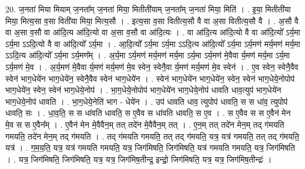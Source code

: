 \documentclass[17pt]{extarticle}
\begin{document}
20. ज॒नता॑ मिया मियाम् ज॒नता᳚म् ज॒नता॑ मिया॒ मितीती॑याम् ज॒नता᳚म् ज॒नता॑ मिया॒ मिति॑ । . इ॒या॒ मितीती॑या मिया॒ मित्य॒सा व॒सा विती॑या मिया॒ मित्य॒सौ । . इत्य॒सा व॒सा वितीत्य॒सौ वै वा अ॒सा वितीत्य॒सौ वै । . अ॒सौ वै वा अ॒सा व॒सौ वा आ॑दि॒त्य आ॑दि॒त्यो वा अ॒सा व॒सौ वा आ॑दि॒त्यः । . वा आ॑दि॒त्य आ॑दि॒त्यो वै वा आ॑दि॒त्यो᳚ ऽर्य॒मा ऽर्य॒मा ऽऽदि॒त्यो वै वा आ॑दि॒त्यो᳚ ऽर्य॒मा । . आ॒दि॒त्यो᳚ ऽर्य॒मा ऽर्य॒मा ऽऽदि॒त्य आ॑दि॒त्यो᳚ ऽर्य॒मा ऽर्य॒मण॑ मर्य॒मण॑ मर्य॒मा ऽऽदि॒त्य आ॑दि॒त्यो᳚ ऽर्य॒मा ऽर्य॒मण᳚म् । . अ॒र्य॒मा ऽर्य॒मण॑ मर्य॒मण॑ मर्य॒मा ऽर्य॒मा ऽर्य॒मण॑ मे॒वैवा र्य॒मण॑ मर्य॒मा ऽर्य॒मा ऽर्य॒मण॑ मे॒व । . अ॒र्य॒मण॑ मे॒वैवा र्य॒मण॑ मर्य॒मण॑ मे॒व स्वेन॒ स्वेनै॒वा र्य॒मण॑ मर्य॒मण॑ मे॒व स्वेन॑ । . ए॒व स्वेन॒ स्वेनै॒वैव स्वेन॑ भाग॒धेये॑न भाग॒धेये॑न॒ स्वेनै॒वैव स्वेन॑ भाग॒धेये॑न । . स्वेन॑ भाग॒धेये॑न भाग॒धेये॑न॒ स्वेन॒ स्वेन॑ भाग॒धेये॒नोपोप॑ भाग॒धेये॑न॒ स्वेन॒ स्वेन॑ भाग॒धेये॒नोप॑ । . भा॒ग॒धेये॒नोपोप॑ भाग॒धेये॑न भाग॒धेये॒नोप॑ धावति धाव॒त्युप॑ भाग॒धेये॑न भाग॒धेये॒नोप॑ धावति । . भा॒ग॒धेये॒नेति॑ भाग - धेये॑न । . उप॑ धावति धाव॒ त्युपोप॑ धावति॒ स स धा॑व॒ त्युपोप॑ धावति॒ सः । . धा॒व॒ति॒ स स धा॑वति धावति॒ स ए॒वैव स धा॑वति धावति॒ स ए॒व । . स ए॒वैव स स ए॒वैन॑ मेन मे॒व स स ए॒वैन᳚म् । . ए॒वैन॑ मेन मे॒वैवैन॒म् तत् तदे॑न मे॒वैवैन॒म् तत् । . ए॒न॒म् तत् तदे॑न मेन॒म् तद् ग॑मयति गमयति॒ तदे॑न मेन॒म् तद् ग॑मयति । . तद् ग॑मयति गमयति॒ तत् तद् ग॑मयति॒ यत्र॒ यत्र॑ गमयति॒ तत् तद् ग॑मयति॒ यत्र॑ । . ग॒म॒य॒ति॒ यत्र॒ यत्र॑ गमयति गमयति॒ यत्र॒ जिग॑मिषति॒ जिग॑मिषति॒ यत्र॑ गमयति गमयति॒ यत्र॒ जिग॑मिषति । . यत्र॒ जिग॑मिषति॒ जिग॑मिषति॒ यत्र॒ यत्र॒ जिग॑मिष॒तीन्द्र॒ इन्द्रो॒ जिग॑मिषति॒ यत्र॒ यत्र॒ जिग॑मिष॒तीन्द्रः॑ । \newline
\end{document}

